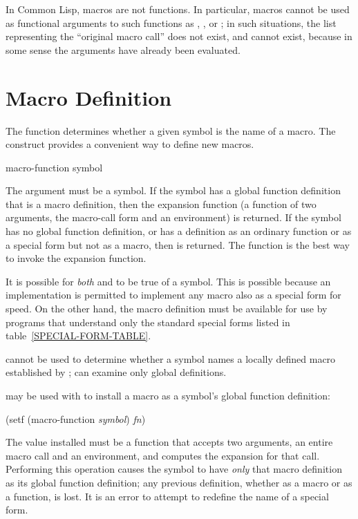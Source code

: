 In Common Lisp, macros are not functions.
In particular, macros cannot be used as
functional arguments to such functions as , ,
or ; in such situations, the list representing the ``original macro
call'' does not exist, and cannot exist, because in some sense the arguments
have already been evaluated.


\section{Macro Definition}

The function  determines whether a given symbol
is the name of a macro.  The  construct provides
a convenient way to define new macros.

\begin{obsolete}
\begin{defun}[Function]
macro-function symbol

The argument must be a symbol.  If the symbol has a global function definition
that is a macro definition, then the expansion function
(a function of two arguments, the macro-call form and an environment)
is returned.
If the symbol has no global function definition, or has a definition
as an ordinary function or as a special form but not as a macro, then
{\false} is returned.  The function 
is the best way to invoke the expansion function.

It is possible for \emph{both}  and 
to be true of a symbol.  This is possible because an implementation is
permitted to implement any macro also as a special form for speed.
On the other hand, the macro definition must be available
for use by programs that understand only the standard special forms
listed in table~\ref{SPECIAL-FORM-TABLE}.

 cannot be used to determine whether a symbol names
a locally defined macro established by ;
 can
examine only global definitions.

 may be used with  to install
a macro as a symbol's global function definition:
\begin{lisp}
(setf (macro-function \emph{symbol}) \emph{fn})
\end{lisp}
The value installed must be a function that accepts two arguments,
an entire macro call and an environment, and computes the expansion for that call.
Performing this operation causes the symbol to have \emph{only} that
macro definition as its global function definition; any previous
definition, whether as a macro or as a function, is lost.
It is an error to attempt to redefine the name of a special
form.
\end{defun}
\end{obsolete}

